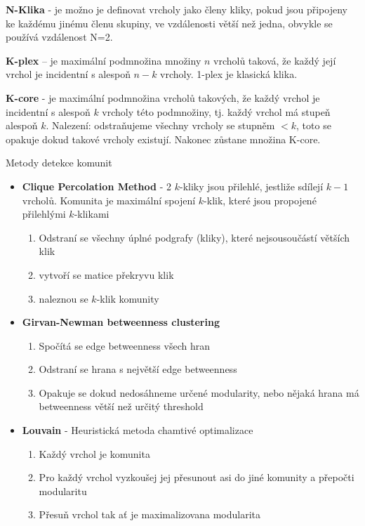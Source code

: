 \documentclass[a4paper,12pt]{article}
\begin{document}
\textbf{N-Klika} - je možno je definovat vrcholy jako členy kliky, pokud jsou připojeny ke každému jinému členu skupiny, ve vzdálenosti větší než jedna, 
obvykle se používá vzdálenost N=2.

\textbf{K-plex} – je maximální podmnožina množiny $n$ vrcholů taková, že každý její vrchol je incidentní s alespoň $n-k$ vrcholy. 1-plex je klasická klika.

\textbf{K-core} - je maximální podmnožina vrcholů takových, že každý vrchol je incidentní s alespoň $k$ vrcholy této podmnožiny, tj. každý vrchol má stupeň
alespoň $k$. Nalezení: odstraňujeme všechny vrcholy se stupněm $<k$, toto se opakuje dokud takové vrcholy existují. Nakonec zůstane množina K-core.

Metody detekce komunit
\begin{itemize}
    \item \textbf{Clique Percolation Method} - 2 $k$-kliky jsou přilehlé, jestliže sdílejí $k-1$ vrcholů. Komunita je maximální spojení $k$-klik, které jsou propojené přilehlými $k$-klikami
        \begin{enumerate}
            \item Odstraní se všechny úplné podgrafy (kliky), které nejsousoučástí větších klik
            \item vytvoří se matice překryvu klik
            \item naleznou se $k$-klik komunity
        \end{enumerate}
    \item \textbf{Girvan-Newman betweenness clustering}
        \begin{enumerate}
            \item Spočítá se edge betweenness všech hran
            \item Odstraní se hrana s největší edge betweenness
            \item Opakuje se dokud nedosáhneme určené modularity, nebo nějaká hrana má betweenness větší než určitý threshold
        \end{enumerate}
    \item \textbf{Louvain} - Heuristická metoda chamtivé optimalizace
    \begin{enumerate}
        \item Každý vrchol je komunita
        \item Pro každý vrchol vyzkoušej jej přesunout asi do jiné komunity a přepočti modularitu
        \item Přesuň vrchol tak ať je maximalizovana modularita

\end{enumerate}
\end{itemize}
\end{document}
